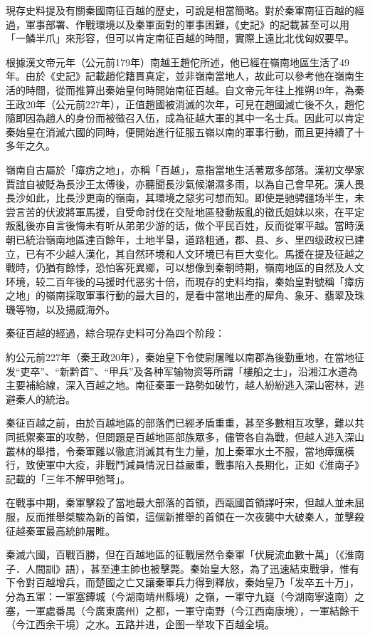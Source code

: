 現存史料提及有關秦國南征百越的歷史，可說是相當簡略。對於秦軍南征百越的經過，軍事部署、作戰環境以及秦軍面對的軍事困難，《史記》的記載甚至可以用「一鱗半爪」來形容，但可以肯定南征百越的時間，實際上遠比北伐匈奴要早。

根據漢文帝元年（公元前179年）南越王趙佗所述，他已經在嶺南地區生活了49年。由於《史記》記載趙佗籍貫真定，並非嶺南當地人，故此可以參考他在嶺南生活的時間，從而推算出秦始皇何時開始南征百越。自文帝元年往上推朔49年，為秦王政20年（公元前227年），正值趙國被消滅的次年，可見在趙國滅亡後不久，趙佗隨即因為趙人的身份而被徵召入伍，成為征越大軍的其中一名士兵。因此可以肯定秦始皇在消滅六國的同時，便開始進行征服五嶺以南的軍事行動，而且更持續了十多年之久。

嶺南自古屬於「瘴疠之地」，亦稱「百越」，意指當地生活著眾多部落。漢初文學家賈誼自被貶為長沙王太傅後，亦聽聞長沙氣候潮濕多雨，以為自己會早死。漢人畏長沙如此，比長沙更南的嶺南，其環境之惡劣可想而知。即使是驰骋疆场半生，未尝言苦的伏波將軍馬援，自受命討伐在交阯地區發動叛亂的徵氏姐妹以來，在平定叛亂後亦自言後悔未有听从弟弟少游的话，做个平民百姓，反而從軍平越。當時漢朝已統治嶺南地區達百餘年，土地半垦，道路粗通，郡、县、乡、里四级政权已建立，已有不少越人漢化，其自然环境和人文环境已有巨大变化。馬援在提及征越之戰時，仍猶有餘悸，恐怕客死異鄉，可以想像到秦朝時期，嶺南地區的自然及人文环境，较二百年後的马援时代恶劣十倍，而現存的史料均指，秦始皇對號稱「瘴疠之地」的嶺南採取軍事行動的最大目的，是看中當地出產的犀角、象牙、翡翠及珠璣等物，以及揚威海外。

秦征百越的經過，綜合現存史料可分為四个阶段：

約公元前227年（秦王政20年），秦始皇下令使尉屠睢以南郡為後勤重地，在當地征发“吏卒”、“新黔首”、“甲兵”及各种军输物资等所謂「樓船之士」，沿湘江水道為主要補給線，深入百越之地。南征秦軍一路勢如破竹，越人紛紛逃入深山密林，逃避秦人的統治。

秦征百越之前，由於百越地區的部落們已經矛盾重重，甚至多數相互攻擊，難以共同抵禦秦軍的攻勢，但問題是百越地區部族眾多，儘管各自為戰，但越人逃入深山叢林的舉措，令秦軍難以徹底消滅其有生力量，加上秦軍水土不服，當地瘴癘橫行，致使軍中大疫，非戰鬥減員情況日益嚴重，戰事陷入長期化，正如《淮南子》記載的「三年不解甲弛弩」。

在戰事中期，秦軍擊殺了當地最大部落的首領，西甌國首領譯吁宋，但越人並未屈服，反而推舉桀駿為新的首領，這個新推舉的首領在一次夜襲中大破秦人，並擊殺征越秦軍最高統帥屠睢。

秦滅六國，百戰百勝，但在百越地區的征戰居然令秦軍「伏屍流血數十萬」（《淮南子．人間訓》語），甚至連主帥也被擊斃。秦始皇大怒，為了迅速結束戰爭，惟有下令對百越增兵，而楚國之亡又讓秦軍兵力得到釋放，秦始皇乃「发卒五十万」，分為五軍：一軍塞鐔城（今湖南靖州縣境）之嶺，一軍守九嶷（今湖南寧遠南）之塞，一軍處番禺（今廣東廣州）之都，一軍守南野（今江西南康境），一軍結餘干（今江西余干境）之水。五路并进，企图一举攻下百越全境。

